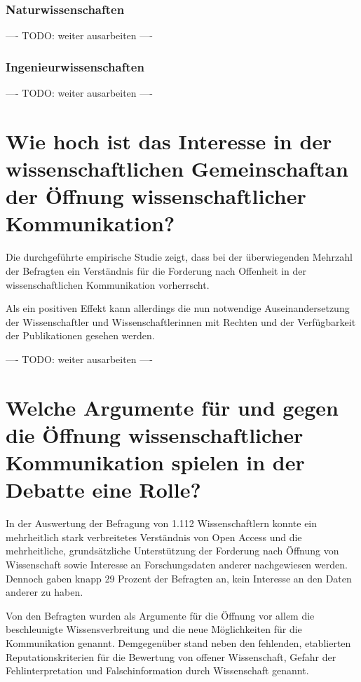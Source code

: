 \subsubsection{Naturwissenschaften}

---- TODO: weiter ausarbeiten ----

\subsubsection{Ingenieurwissenschaften}

---- TODO: weiter ausarbeiten ----

\section{Wie hoch ist das Interesse in der wissenschaftlichen Gemeinschaftan der Öffnung wissenschaftlicher Kommunikation?}


Die durchgeführte empirische Studie zeigt, dass bei der überwiegenden Mehrzahl der Befragten ein Verständnis für die Forderung nach Offenheit in der wissenschaftlichen Kommunikation vorherrscht.

Als ein positiven Effekt kann allerdings die nun notwendige Auseinandersetzung der Wissenschaftler und Wissenschaftlerinnen mit Rechten und der Verfügbarkeit der Publikationen gesehen werden.

---- TODO: weiter ausarbeiten ----


\section{Welche Argumente für und gegen die Öffnung wissenschaftlicher Kommunikation spielen in der Debatte eine Rolle?}

In der Auswertung der Befragung von 1.112 Wissenschaftlern konnte ein mehrheitlich stark verbreitetes Verständnis von Open Access und die mehrheitliche, grundsätzliche Unterstützung der Forderung nach Öffnung von Wissenschaft sowie Interesse an Forschungsdaten anderer nachgewiesen werden. Dennoch gaben knapp 29 Prozent der Befragten an, kein Interesse an den Daten anderer zu haben.

Von den Befragten wurden als Argumente für die Öffnung vor allem die beschleunigte Wissensverbreitung und die neue Möglichkeiten für die Kommunikation genannt. Demgegenüber stand neben den fehlenden, etablierten Reputationskriterien für die Bewertung von offener Wissenschaft, Gefahr der Fehlinterpretation und Falschinformation durch Wissenschaft genannt.

